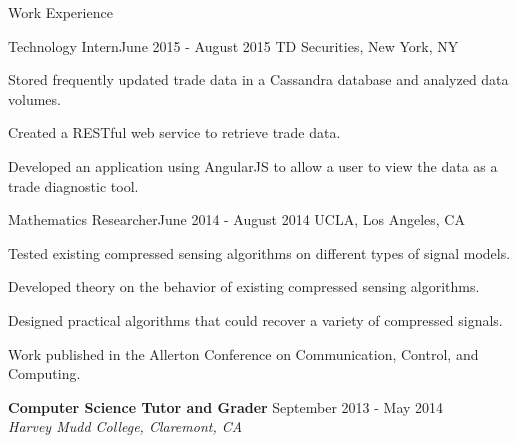 \documentclass{resume} %
\begin{document}
\begin{rSection}{Work Experience}





\begin{rSubsection}{Technology Intern}{June 2015 - August 2015}{ }{TD Securities, New York, NY}
\item Stored frequently updated trade data in a Cassandra database and analyzed data volumes.
\item Created a RESTful web service to retrieve trade data.
\item Developed an application using AngularJS  to allow a user to view the data as a trade diagnostic tool. 
\end{rSubsection}


\vspace{-2mm}



\begin{rSubsection}{Mathematics Researcher}{June 2014 - August 2014}{ }{UCLA, Los Angeles, CA}
\item Tested existing compressed sensing algorithms on different types of  signal models.
\item Developed theory on the behavior of existing compressed sensing algorithms. 
\item Designed practical algorithms that could recover a variety of compressed signals. 
\item Work published in the Allerton Conference on Communication, Control, and Computing.

\end{rSubsection}


\vspace{-2mm}



\textbf{Computer Science Tutor and Grader} 
\hfill 
September 2013 - May 2014\\
\textit{Harvey Mudd College, Claremont, CA}
\smallskip


\end{rSection}
\end{document}
